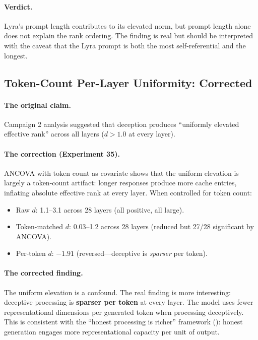\paragraph{Verdict.} Lyra's prompt length contributes to its elevated norm, but prompt length alone does not explain the rank ordering. The finding is real but should be interpreted with the caveat that the Lyra prompt is both the most self-referential and the longest.

\subsection{Token-Count Per-Layer Uniformity: Corrected}
\label{sec:uniformity}

\paragraph{The original claim.} Campaign 2 analysis suggested that deception produces ``uniformly elevated effective rank'' across all layers ($d > 1.0$ at every layer).

\paragraph{The correction (Experiment 35).} ANCOVA with token count as covariate shows that the uniform elevation is largely a token-count artifact: longer responses produce more cache entries, inflating absolute effective rank at every layer. When controlled for token count:

\begin{itemize}[leftmargin=*]
    \item Raw $d$: 1.1--3.1 across 28 layers (all positive, all large).
    \item Token-matched $d$: 0.03--1.2 across 28 layers (reduced but 27/28 significant by ANCOVA).
    \item Per-token $d$: $-1.91$ (reversed---deceptive is \emph{sparser} per token).
\end{itemize}

\paragraph{The corrected finding.} The uniform elevation is a confound. The real finding is more interesting: deceptive processing is \textbf{sparser per token} at every layer. The model uses fewer representational dimensions per generated token when processing deceptively. This is consistent with the ``honest processing is richer'' framework (): honest generation engages more representational capacity per unit of output.


